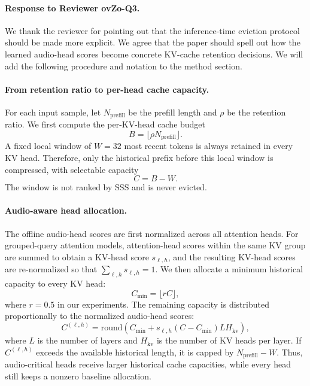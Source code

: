 \begin{answer}

    \paragraph{Response to Reviewer ovZo-Q3.}
    We thank the reviewer for pointing out that the inference-time eviction protocol should be made more explicit.
    We agree that the paper should spell out how the learned audio-head scores become concrete KV-cache retention decisions.
    We will add the following procedure and notation to the method section.

    \paragraph{From retention ratio to per-head cache capacity.}
    For each input sample, let $N_{\mathrm{prefill}}$ be the prefill length and $\rho$ be the retention ratio.
    We first compute the per-KV-head cache budget
    \[
        B = \lfloor \rho N_{\mathrm{prefill}} \rfloor .
    \]
    A fixed local window of $W=32$ most recent tokens is always retained in every KV head.
    Therefore, only the historical prefix before this local window is compressed, with selectable capacity
    \[
        C = B - W .
    \]
    The window is not ranked by SSS and is never evicted.

    \paragraph{Audio-aware head allocation.}
    The offline audio-head scores are first normalized across all attention heads.
    For grouped-query attention models, attention-head scores within the same KV group are summed to obtain a KV-head score $s_{\ell,h}$, and the resulting KV-head scores are re-normalized so that $\sum_{\ell,h} s_{\ell,h}=1$.
    We then allocate a minimum historical capacity to every KV head:
    \[
        C_{\min}=\lfloor rC \rfloor ,
    \]
    where $r=0.5$ in our experiments.
    The remaining capacity is distributed proportionally to the normalized audio-head scores:
    \[
        C^{(\ell,h)}
        =
        \mathrm{round}\left(
        C_{\min}
        +
        s_{\ell,h}(C-C_{\min})LH_{\mathrm{kv}}
        \right),
    \]
    where $L$ is the number of layers and $H_{\mathrm{kv}}$ is the number of KV heads per layer.
    If $C^{(\ell,h)}$ exceeds the available historical length, it is capped by $N_{\mathrm{prefill}}-W$.
    Thus, audio-critical heads receive larger historical cache capacities, while every head still keeps a nonzero baseline allocation.


\end{answer}
